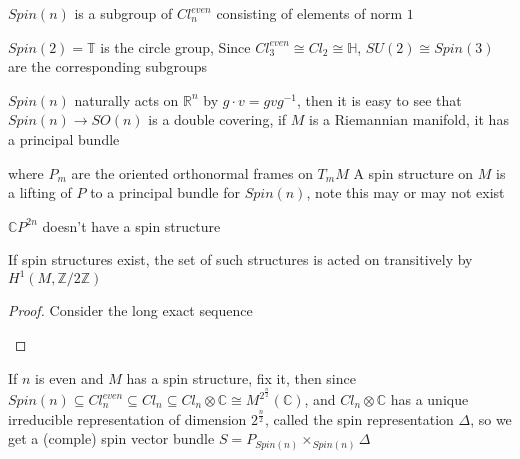 \documentclass[../main.tex]{subfiles}
\begin{document}
\begin{definition}
$Spin(n)$ is a subgroup of $Cl_n^{even}$ consisting of elements of norm $1$
\end{definition}

\begin{example}
$Spin(2)=\mathbb T$ is the circle group, Since $Cl_3^{even}\cong Cl_2\cong\mathbb H$, $SU(2)\cong Spin(3)$ are the corresponding subgroups
\end{example}

\begin{definition}
$Spin(n)$ naturally acts on $\mathbb R^n$ by $g\cdot v=gvg^{-1}$, then it is easy to see that $Spin(n)\to SO(n)$ is a double covering, if $M$ is a Riemannian manifold, it has a principal bundle  where $P_m$ are the oriented orthonormal frames on $T_mM$
A spin structure on $M$ is a lifting of $P$ to a principal bundle for $Spin(n)$, note this may or may not exist
\end{definition}

\begin{example}
$\mathbb CP^{2n}$ doesn't have a spin structure
\end{example}

\begin{proposition}
If spin structures exist, the set of such structures is acted on transitively by $H^1(M,\mathbb Z/2\mathbb Z)$
\end{proposition}

\begin{proof}
Consider the long exact sequence \par
\begin{center}
\end{center}
\end{proof}

\begin{proposition}
If $n$ is even and $M$ has a spin structure, fix it, then since $Spin(n)\subseteq Cl_n^{even}\subseteq Cl_n\subseteq Cl_n\otimes\mathbb C\cong M^{2^{\frac{n}{2}}}(\mathbb C)$, and $Cl_n\otimes\mathbb C$ has a unique irreducible representation of dimension $2^{\frac{n}{2}}$, called the spin representation $\Delta$, so we get a (comple) spin vector bundle $S=P_{Spin(n)}\times_{Spin(n)}\Delta$
\end{proposition}
\end{document}
